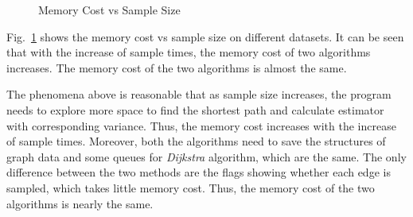\documentclass[runningheads,a4paper]{llncs}
\begin{document}
\begin{figure}[htbp]
\vspace{-1.1cm}
  \centering
\vspace{-0.3cm}
  \caption{Memory Cost vs Sample Size}
  \label{fig:memory}
\vspace{-0.6cm}
\end{figure}

Fig.~\ref{fig:memory} shows the memory cost vs sample size on different datasets. It can be seen that with the increase of sample times, the memory cost of two algorithms increases. The memory cost of the two algorithms is almost the same.

The phenomena above is reasonable that as sample size increases, the program needs to explore more space to find the shortest path and calculate estimator with corresponding variance. Thus, the memory cost increases with the increase of sample times. Moreover, both the algorithms need to save the structures of graph data and some queues for \emph{Dijkstra} algorithm, which are the same. The only difference between the two methods are the flags showing whether each edge is sampled, which takes little memory cost. Thus, the memory cost of the two algorithms is nearly the same.
\end{document}
